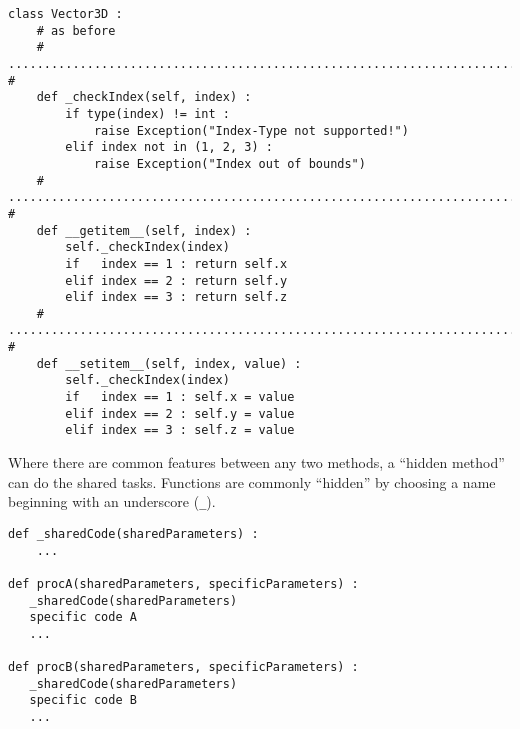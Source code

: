 \begin{frame}[fragile]
%
\vspace{-6pt}
\begin{codebox}
\begin{verbatim}
class Vector3D :
    # as before
    # ........................................................................ #
    def _checkIndex(self, index) :
        if type(index) != int :
            raise Exception("Index-Type not supported!")
        elif index not in (1, 2, 3) :
            raise Exception("Index out of bounds")
    # ........................................................................ #    
    def __getitem__(self, index) :
        self._checkIndex(index)
        if   index == 1 : return self.x
        elif index == 2 : return self.y
        elif index == 3 : return self.z    
    # ........................................................................ #    
    def __setitem__(self, index, value) :
        self._checkIndex(index)
        if   index == 1 : self.x = value
        elif index == 2 : self.y = value
        elif index == 3 : self.z = value
\end{verbatim}
\end{codebox}
%
\end{frame}


\begin{frame}[fragile]
%
\vspace{-6pt}
\begin{hintbox}
Where there are common features between any two methods, a \enquote{hidden method} can do the shared tasks. Functions are commonly \enquote{hidden} by choosing a name beginning with an underscore (\texttt{\_}).
\end{hintbox}
%
\begin{codebox}
\begin{verbatim}
def _sharedCode(sharedParameters) :
    ...

def procA(sharedParameters, specificParameters) :
   _sharedCode(sharedParameters)
   specific code A
   ...

def procB(sharedParameters, specificParameters) :
   _sharedCode(sharedParameters)
   specific code B
   ...
\end{verbatim}
\end{codebox}
%
\end{frame}

